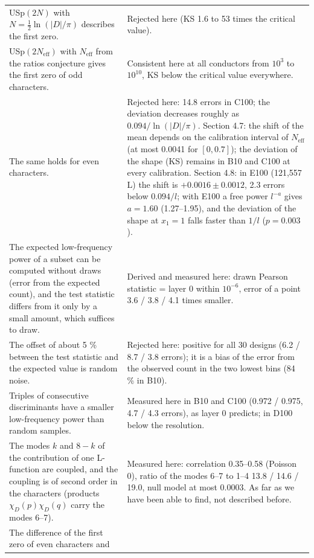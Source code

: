 \documentclass[
  10pt,
]{article}
\begin{document}
{\begin{longtable}[]{@{}
  >{\raggedright\arraybackslash}p{}
  >{\raggedright\arraybackslash}p{}@{}}
USp\((2N)\) with \(N = \frac12\ln(|D|/\pi)\) describes the first zero. &
Rejected here (KS 1.6 to 53 times the critical value). \\ \addlinespace[2pt]
USp\((2N_{\mathrm{eff}})\) with \(N_{\mathrm{eff}}\) from the ratios
conjecture gives the first zero of odd characters. & Consistent here at
all conductors from \(10^3\) to \(10^{10}\), KS below the critical value
everywhere. \\ \addlinespace[2pt]
The same holds for even characters. & Rejected here: 14.8 errors in
C100; the deviation decreases roughly as \(0.094/\ln(|D|/\pi)\). Section
4.7: the shift of the mean depends on the calibration interval of
\(N_{\mathrm{eff}}\) (at most 0.0041 for \([0, 0.7]\)); the deviation of
the shape (KS) remains in B10 and C100 at every calibration. Section
4.8: in E100 (121,557 L) the shift is \(+0.0016 \pm 0.0012\), 2.3 errors
below \(0.094/l\); with E100 a free power \(l^{-a}\) gives \(a = 1.60\)
(1.27--1.95), and the deviation of the shape at \(x_1 = 1\) falls faster
than \(1/l\) (\(p = 0.003\)). \\ \addlinespace[2pt]
The expected low-frequency power of a subset can be computed without
draws (error from the expected count), and the test statistic differs
from it only by a small amount, which suffices to draw. & Derived and
measured here: drawn Pearson statistic = layer 0 within \(10^{-6}\),
error of a point 3.6 / 3.8 / 4.1 times smaller. \\ \addlinespace[2pt]
The offset of about 5 \% between the test statistic and the expected
value is random noise. & Rejected here: positive for all 30 designs (6.2
/ 8.7 / 3.8 errors); it is a bias of the error from the observed count
in the two lowest bins (84 \% in B10). \\ \addlinespace[2pt]
Triples of consecutive discriminants have a smaller low-frequency power
than random samples. & Measured here in B10 and C100 (0.972 / 0.975, 4.7
/ 4.3 errors), as layer 0 predicts; in D100 below the resolution. \\ \addlinespace[2pt]
The modes \(k\) and \(8 - k\) of the contribution of one L-function are
coupled, and the coupling is of second order in the characters (products
\(\chi_D(p)\chi_D(q)\) carry the modes 6--7). & Measured here:
correlation 0.35--0.58 (Poisson 0), ratio of the modes 6--7 to 1--4 13.8
/ 14.6 / 19.0, null model at most 0.0003. As far as we have been able to
find, not described before. \\ \addlinespace[2pt]
The difference of the first zero of even characters and

\end{longtable}}
\end{document}
